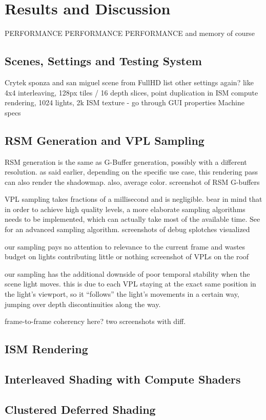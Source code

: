 

\chapter{Results and Discussion}

PERFORMANCE PERFORMANCE PERFORMANCE
and memory of course
\section{Scenes, Settings and Testing System}
\begin{outline}
\1 Crytek sponza and san miguel scene from \citep{McGuire2011Data}
\1 FullHD
\1 list other settings again? like 4x4 interleaving, 128px tiles / 16 depth slices, point duplication in ISM compute rendering, 1024 lights, 2k ISM texture
    - go through GUI properties
\1 Machine specs
\end{outline}

\section{RSM Generation and VPL Sampling}
\begin{outline}
\1 RSM generation is the same as G-Buffer generation, possibly with a different resolution. as said earlier, depending on the specific use case, this rendering pass can also render the shadowmap. also, average color.
\1 screenshot of RSM G-buffers

\1 VPL sampling takes fractions of a millisecond and is negligible. bear in mind that in order to achieve high quality levels, a more elaborate sampling algorithms needs to be implemented, which can actually take most of the available time. See \citep{hedman2016sequential} for an advanced sampling algorithm.
\1 screenshots of debug splotches visualized

\1 our sampling pays no attention to relevance to the current frame and wastes budget on lights contributing little or nothing
\1 screenshot of VPLs on the roof

\1 our sampling has the additional downside of poor temporal stability when the scene light moves. this is due to each VPL staying at the exact same position in the light's viewport, so it ``follows'' the light's movements in a certain way, jumping over depth discontinuities along the way.

\1 frame-to-frame coherency here? two screenshots with diff.
\end{outline}

\section{ISM Rendering}

\section{Interleaved Shading with Compute Shaders}

\section{Clustered Deferred Shading}
